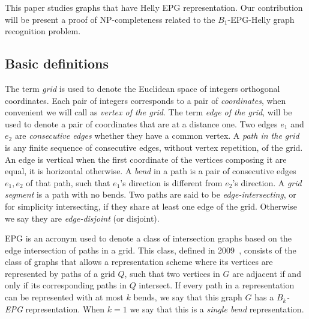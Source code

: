 \documentclass[a4paper,11pt]{article}
\begin{document}
This paper studies graphs that have Helly EPG representation. Our contribution will be present a proof of NP-completeness related to the $ B_1$-EPG-Helly graph recognition problem.

 
 
 \subsection{Basic definitions}


The term \emph{grid} is used to denote the Euclidean space of integers orthogonal coordinates. Each pair of integers corresponds to a pair of \emph{coordinates},  when convenient we will call as \emph {vertex of the grid}. The term \emph{edge of the grid}, will be used to denote a pair of coordinates that are at a distance one. Two edges $e_1$ and $e_2$ are \emph{consecutive edges} whether they have a common vertex. %
A \emph{path in the grid} is any finite sequence of consecutive edges, without vertex repetition, of the grid.
An edge is vertical when the first coordinate of the vertices composing it are equal, it is horizontal otherwise. A \emph {bend} in a path is a pair of consecutive edges $ e_1, e_2 $ of that path, such that $ e_1$'s direction is different from $ e_2$'s direction. A \emph {grid segment} is a path with no bends. Two paths are said to be \emph{edge-intersecting}, or for simplicity  intersecting, if they share at least one edge of the grid. Otherwise we say they are \emph{edge-disjoint} (or disjoint).

EPG is an acronym used to denote a class of intersection graphs based on the edge intersection of paths in a grid. This class, defined in 2009~\citep{golumbic2009}, consists of the class of graphs that allows a representation scheme where its vertices are represented by paths of a grid $ Q $, such that two vertices in $ G $ are adjacent if and only if its corresponding paths in $ Q $ intersect. If every path in a representation can be represented with at most $ k $ bends, we say that this graph $ G $ has a \emph{ $ B_k$-EPG} representation.%
When $ k = 1 $ we say that this is a \emph{single bend} representation.
\end{document}

